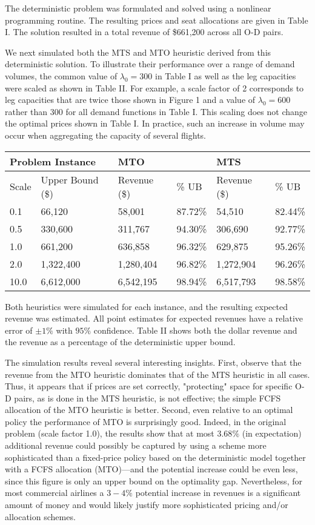 The deterministic problem was formulated and solved using a nonlinear programming routine. The resulting prices and seat allocations are given in Table I. The solution resulted in a total revenue of \$661,200 across all O-D pairs.

We next simulated both the MTS and MTO heuristic derived from this deterministic solution. To illustrate their performance over a range of demand volumes, the common value of \(\lambda_0 = 300\) in Table I as well as the leg capacities were scaled as shown in Table II. For example, a scale factor of 2 corresponds to leg capacities that are twice those shown in Figure 1 and a value of \(\lambda_0 = 600\) rather than 300 for all demand functions in Table I. This scaling does not change the optimal prices shown in Table I. In practice, such an increase in volume may occur when aggregating the capacity of several flights.

\begin{longtable}{|l|l|l|l|l|l|}
\hline
\multicolumn{2}{|l|}{Problem Instance} & \multicolumn{2}{l|}{MTO} & \multicolumn{2}{l|}{MTS} \\
\hline
Scale & Upper Bound (\$) & Revenue (\$) & \% UB & Revenue (\$) & \% UB \\
\hline
0.1 & 66,120 & 58,001 & 87.72\% & 54,510 & 82.44\% \\
\hline
0.5 & 330,600 & 311,767 & 94.30\% & 306,690 & 92.77\% \\
\hline
1.0 & 661,200 & 636,858 & 96.32\% & 629,875 & 95.26\% \\
\hline
2.0 & 1,322,400 & 1,280,404 & 96.82\% & 1,272,904 & 96.26\% \\
\hline
10.0 & 6,612,000 & 6,542,195 & 98.94\% & 6,517,793 & 98.58\% \\
\hline
\end{longtable}

Both heuristics were simulated for each instance, and the resulting expected revenue was estimated. All point estimates for expected revenues have a relative error of \(\pm 1\%\) with \(95\%\) confidence. Table II shows both the dollar revenue and the revenue as a percentage of the deterministic upper bound.

The simulation results reveal several interesting insights. First, observe that the revenue from the MTO heuristic dominates that of the MTS heuristic in all cases. Thus, it appears that if prices are set correctly, "protecting" space for specific O-D pairs, as is done in the MTS heuristic, is not effective; the simple FCFS allocation of the MTO heuristic is better. Second, even relative to an optimal policy the performance of MTO is surprisingly good. Indeed, in the original problem (scale factor 1.0), the results show that at most \(3.68\%\) (in expectation) additional revenue could possibly be captured by using a scheme more sophisticated than a fixed-price policy based on the deterministic model together with a FCFS allocation (MTO)—and the potential increase could be even less, since this figure is only an upper bound on the optimality gap. Nevertheless, for most commercial airlines a \(3-4\%\) potential increase in revenues is a significant amount of money and would likely justify more sophisticated pricing and/or allocation schemes.

